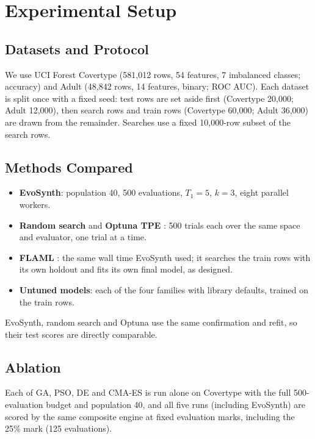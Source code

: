 \documentclass[conference]{IEEEtran}
\begin{document}
\section{Experimental Setup}\label{sec:setup}

\subsection{Datasets and Protocol}
We use UCI Forest Covertype \cite{blackard1999comparative} (581,012 rows, 54 features, 7 imbalanced classes; accuracy) and Adult \cite{kohavi1996scaling} (48,842 rows, 14 features, binary; ROC AUC). Each dataset is split once with a fixed seed: test rows are set aside first (Covertype 20,000; Adult 12,000), then search rows and train rows (Covertype 60,000; Adult 36,000) are drawn from the remainder. Searches use a fixed 10,000-row subset of the search rows.

\subsection{Methods Compared}
\begin{itemize}
    \item \textbf{EvoSynth}: population 40, 500 evaluations, $T_1 = 5$, $k = 3$, eight parallel workers.
    \item \textbf{Random search} \cite{bergstra2012random} and \textbf{Optuna TPE} \cite{akiba2019optuna}: 500 trials each over the same space and evaluator, one trial at a time.
    \item \textbf{FLAML} \cite{wang2021flaml}: the same wall time EvoSynth used; it searches the train rows with its own holdout and fits its own final model, as designed.
    \item \textbf{Untuned models}: each of the four families with library defaults, trained on the train rows.
\end{itemize}
EvoSynth, random search and Optuna use the same confirmation and refit, so their test scores are directly comparable.

\subsection{Ablation}
Each of GA, PSO, DE and CMA-ES is run alone on Covertype with the full 500-evaluation budget and population 40, and all five runs (including EvoSynth) are scored by the same composite engine at fixed evaluation marks, including the 25\% mark (125 evaluations).
\end{document}
